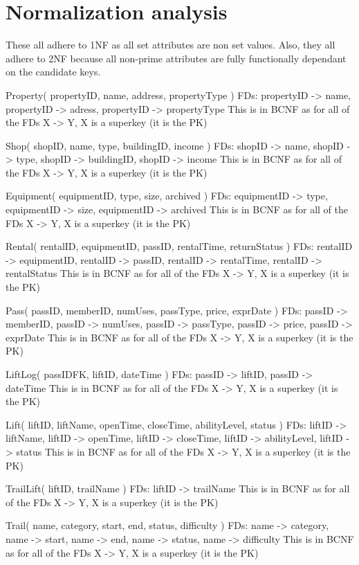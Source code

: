 \documentclass[11pt]{scrartcl}
\begin{document}
\section{Normalization analysis}

These all adhere to 1NF as all set attributes are non set values. Also, they all adhere to 2NF 
because all non-prime attributes are fully functionally dependant on the candidate keys.

Property( propertyID, name, address, propertyType )
FDs: propertyID -> name, propertyID -> adress, propertyID -> propertyType
This is in BCNF as for all of the FDs X -> Y, X is a superkey (it is the PK)

Shop( shopID, name, type, buildingID, income )
FDs: shopID -> name, shopID -> type, shopID -> buildingID, shopID -> income
This is in BCNF as for all of the FDs X -> Y, X is a superkey (it is the PK)

Equipment( equipmentID, type, size, archived )
FDs: equipmentID -> type, equipmentID -> size, equipmentID -> archived
This is in BCNF as for all of the FDs X -> Y, X is a superkey (it is the PK)

Rental( rentalID, equipmentID, passID, rentalTime, returnStatus )
FDs: rentalID -> equipmentID, rentalID -> passID, rentalID -> rentalTime, rentalID -> rentalStatus
This is in BCNF as for all of the FDs X -> Y, X is a superkey (it is the PK)

Pass( passID, memberID, numUses, passType, price, exprDate )
FDs: passID -> memberID, passID -> numUses, passID -> passType, passID -> price, passID -> exprDate
This is in BCNF as for all of the FDs X -> Y, X is a superkey (it is the PK)

LiftLog( passIDFK, liftID, dateTime )
FDs: passID -> liftID, passID -> dateTime
This is in BCNF as for all of the FDs X -> Y, X is a superkey (it is the PK)

Lift( liftID, liftName, openTime, closeTime, abilityLevel, status )
FDs: liftID -> liftName, liftID -> openTime, liftID -> closeTime, liftID -> abilityLevel, liftID -> status
This is in BCNF as for all of the FDs X -> Y, X is a superkey (it is the PK)

TrailLift( liftID, trailName )
FDs: liftID -> trailName
This is in BCNF as for all of the FDs X -> Y, X is a superkey (it is the PK)

Trail( name, category, start, end, status, difficulty )
FDs: name -> category, name -> start, name -> end, name -> status, name -> difficulty
This is in BCNF as for all of the FDs X -> Y, X is a superkey (it is the PK)
\end{document}
